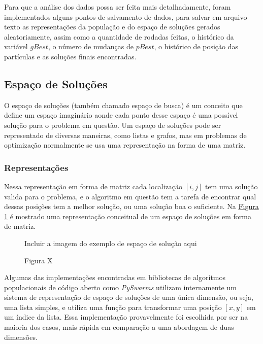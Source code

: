         Para que a análise dos dados possa ser feita mais detalhadamente, foram implementados alguns pontos de salvamento de dados, para salvar em arquivo texto as representações da população e do espaço de soluções gerados aleatoriamente, assim como a quantidade de rodadas feitas, o histórico da variável $gBest$, o número de mudanças de $pBest$, o histórico de posição das partículas e as soluções finais encontradas.
    

    \subsection{Espaço de Soluções}
            O espaço de soluções (também chamado espaço de busca) é um conceito que define um espaço imaginário aonde cada ponto desse espaço é uma possível solução para o problema em questão. 
            Um espaço de soluções pode ser representado de diversas maneiras, como listas e grafos, mas em problemas de optimização normalmente se usa uma representação na forma de uma matriz.\newline
        

        \subsubsection{Representações}
            Nessa representação em forma de matriz cada localização $[i, j]$ tem uma solução valida para o problema, e o algoritmo em questão tem a tarefa de encontrar qual dessas posições tem a melhor solução, ou uma solução boa o suficiente. Na 
            \hyperref[fig:solution-space]{Figura \ref{fig:solution-space}} 
            é mostrado uma representação conceitual de um espaço de soluções em forma de matriz.\newline
            
            \begin{figure}[h]
                \centering
                \small{Incluir a imagem do exemplo de espaço de solução aqui}
                \caption{Figura X}
                \label{fig:solution-space}
            \end{figure}

            Algumas das implementações encontradas em bibliotecas de algoritmos populacionais de código aberto como \textit{PySwarms} utilizam internamente um sistema de representação de espaço de soluções de uma única dimensão, ou seja, uma lista simples, e utiliza uma função para transformar uma posição $[x,y]$ em um índice da lista. Essa implementação provavelmente foi escolhida por ser na maioria dos casos, mais rápida em comparação a uma abordagem de duas dimensões. \newline


